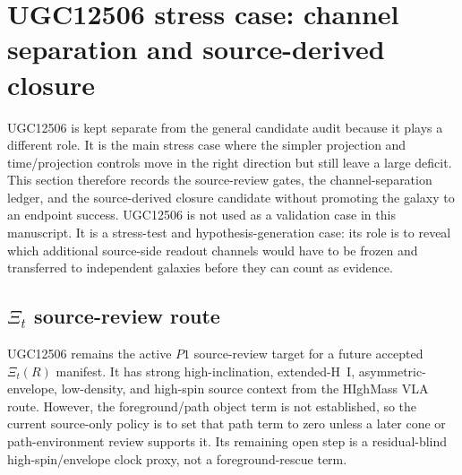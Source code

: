 \documentclass[11pt]{article}
\begin{document}
\section{UGC12506 stress case: channel separation and source-derived closure}
\label{sec:ugc12506-stress}

UGC12506 is kept separate from the general candidate audit because it plays a
different role.  It is the main stress case where the simpler projection and
time/projection controls move in the right direction but still leave a large
deficit.  This section therefore records the source-review gates, the
channel-separation ledger, and the source-derived closure candidate without
promoting the galaxy to an endpoint success.
UGC12506 is not used as a validation case in this manuscript.  It is a
stress-test and hypothesis-generation case: its role is to reveal which
additional source-side readout channels would have to be frozen and transferred
to independent galaxies before they can count as evidence.

\subsection{\(\Xi_t\) source-review route}

UGC12506 remains the active \(P1\) source-review target for a future accepted
\(\Xi_t(R)\) manifest.  It has strong high-inclination, extended-H~I,
asymmetric-envelope, low-density, and high-spin source context from the
HIghMass VLA route.  However, the foreground/path object term is not
established, so the current source-only policy is to set that path term to zero
unless a later cone or path-environment review supports it.  Its remaining open
step is a residual-blind high-spin/envelope clock proxy, not a foreground-rescue
term.
\end{document}
